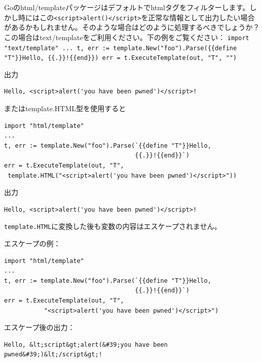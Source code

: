 Goのhtml/templateパッケージはデフォルトでhtmlタグをフィルターします。しかし時にはこの\texttt{<script>alert()</script>}を正常な情報として出力したい場合があるかもしれません。そのような場合はどのように処理するべきでしょうか？この場合はtext/templateをご利用ください。下の例をご覧ください： \texttt{import "text/template" ... t, err := template.New("foo").Parse(\{\{define "T"\}\}Hello, \{\{.\}\}!\{\{end\}\}) err = t.ExecuteTemplate(out, "T", "")}

出力

\begin{lstlisting}[numbers=none]
Hello, <script>alert('you have been pwned')</script>!
\end{lstlisting}

またはtemplate.HTML型を使用すると

\begin{lstlisting}[numbers=none]
import "html/template"
...
t, err := template.New("foo").Parse(`{{define "T"}}Hello,
                                    {{.}}!{{end}}`)
err = t.ExecuteTemplate(out, "T",
 template.HTML("<script>alert('you have been pwned')</script>"))
\end{lstlisting}

出力

\begin{lstlisting}[numbers=none]
Hello, <script>alert('you have been pwned')</script>!
\end{lstlisting}

\texttt{template.HTML}に変換した後も変数の内容はエスケープされません。

エスケープの例：

\begin{lstlisting}[numbers=none]
import "html/template"
...
t, err := template.New("foo").Parse(`{{define "T"}}Hello,
                                    {{.}}!{{end}}`)
err = t.ExecuteTemplate(out, "T",
           "<script>alert('you have been pwned')</script>")
\end{lstlisting}

エスケープ後の出力：

\begin{lstlisting}[numbers=none]
Hello, &lt;script&gt;alert(&#39;you have been pwned&#39;)&lt;/script&gt;!
\end{lstlisting}



